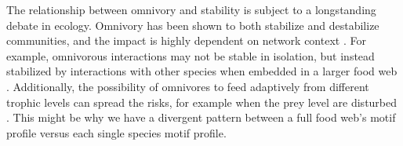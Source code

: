 \documentclass[12pt]{article}
\begin{document}
\begin{spacing}{2.0}



The relationship between omnivory and stability is subject to a longstanding debate in ecology. Omnivory has been shown to both stabilize and destabilize communities, and the impact is highly dependent on network context \citep{bascompte2005simple, MonteiroFaria2016, Kratinaetal2012}. 
For example, omnivorous interactions may not be stable in isolation, but instead stabilized by interactions with other species when embedded in a larger food web \citep{Kratinaetal2012}. Additionally, the possibility of omnivores to feed adaptively from different trophic levels can spread the risks, for example when the prey level are disturbed \citep{Fagan1997}.
This might be why we have a divergent pattern between a full food web's motif profile versus each single species motif profile.


\end{spacing}
\end{document}
